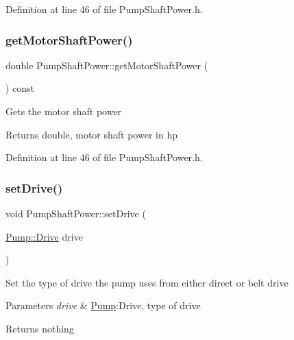 Definition at line 46 of file Pump\+Shaft\+Power.\+h.

\mbox{\label{class_pump_shaft_power_acb91eadb960f946ffee5373d4839a5be}} 
\subsubsection{\texorpdfstring{get\+Motor\+Shaft\+Power()}{getMotorShaftPower()}\hspace{0.1cm}{\footnotesize\ttfamily [3/3]}}
{\footnotesize\ttfamily double Pump\+Shaft\+Power\+::get\+Motor\+Shaft\+Power (\begin{DoxyParamCaption}{ }\end{DoxyParamCaption}) const\hspace{0.3cm}{\ttfamily [inline]}}

Gets the motor shaft power

\begin{DoxyReturn}{Returns}
double, motor shaft power in hp 
\end{DoxyReturn}


Definition at line 46 of file Pump\+Shaft\+Power.\+h.

\mbox{\label{class_pump_shaft_power_a2c35a110c65c582a6f7d1d4c714f8187}} 
\subsubsection{\texorpdfstring{set\+Drive()}{setDrive()}\hspace{0.1cm}{\footnotesize\ttfamily [1/3]}}
{\footnotesize\ttfamily void Pump\+Shaft\+Power\+::set\+Drive (\begin{DoxyParamCaption}\item[{\hyperlink{class_pump_a32bf0ade131a11bb3b3fb374f638e983}{Pump\+::\+Drive}}]{drive }\end{DoxyParamCaption})\hspace{0.3cm}{\ttfamily [inline]}}

Set the type of drive the pump uses from either direct or belt drive


\begin{DoxyParams}{Parameters}
{\em drive} & \hyperlink{class_pump}{Pump}\+:Drive, type of drive\\
\hline
\end{DoxyParams}
\begin{DoxyReturn}{Returns}
nothing 
\end{DoxyReturn}


